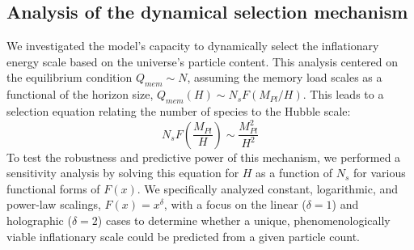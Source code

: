 \documentclass[]{article}
\begin{document}
\subsection{Analysis of the dynamical selection mechanism}
We investigated the model's capacity to dynamically select the inflationary energy scale based on the universe's particle content. This analysis centered on the equilibrium condition $Q_{mem} \sim N$, assuming the memory load scales as a functional of the horizon size, $Q_{mem}(H) \sim N_s F(M_{Pl}/H)$. This leads to a selection equation relating the number of species to the Hubble scale:
\begin{equation}
N_s F\left(\frac{M_{Pl}}{H}\right) \sim \frac{M_{Pl}^2}{H^2}
\label{eq:selection}
\end{equation}
To test the robustness and predictive power of this mechanism, we performed a sensitivity analysis by solving this equation for $H$ as a function of $N_s$ for various functional forms of $F(x)$. We specifically analyzed constant, logarithmic, and power-law scalings, $F(x) = x^\delta$, with a focus on the linear ($\delta=1$) and holographic ($\delta=2$) cases to determine whether a unique, phenomenologically viable inflationary scale could be predicted from a given particle count.
\end{document}
